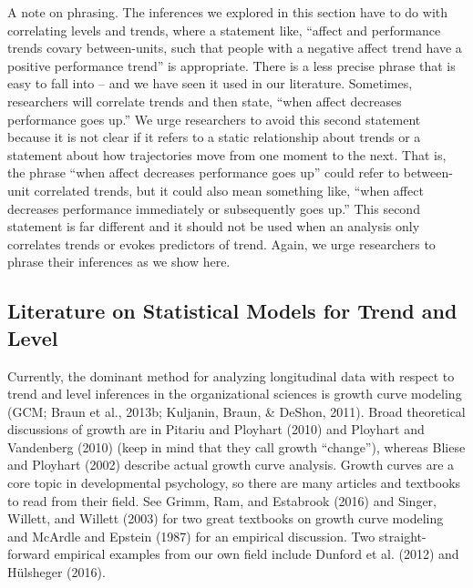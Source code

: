 \documentclass[english,,man]{apa6}
\begin{document}
A note on phrasing. The inferences we explored in this section have to do with correlating levels and trends, where a statement like, \enquote{affect and performance trends covary between-units, such that people with a negative affect trend have a positive performance trend} is appropriate. There is a less precise phrase that is easy to fall into -- and we have seen it used in our literature. Sometimes, researchers will correlate trends and then state, \enquote{when affect decreases performance goes up.} We urge researchers to avoid this second statement because it is not clear if it refers to a static relationship about trends or a statement about how trajectories move from one moment to the next. That is, the phrase \enquote{when affect decreases performance goes up} could refer to between-unit correlated trends, but it could also mean something like, \enquote{when affect decreases performance immediately or subsequently goes up.} This second statement is far different and it should not be used when an analysis only correlates trends or evokes predictors of trend. Again, we urge researchers to phrase their inferences as we show here.

\hypertarget{literature-on-statistical-models-for-trend-and-level}{%
\subsection{Literature on Statistical Models for Trend and Level}\label{literature-on-statistical-models-for-trend-and-level}}

Currently, the dominant method for analyzing longitudinal data with respect to trend and level inferences in the organizational sciences is growth curve modeling (GCM; Braun et al., 2013b; Kuljanin, Braun, \& DeShon, 2011). Broad theoretical discussions of growth are in Pitariu and Ployhart (2010) and Ployhart and Vandenberg (2010) (keep in mind that they call growth \enquote{change}), whereas Bliese and Ployhart (2002) describe actual growth curve analysis. Growth curves are a core topic in developmental psychology, so there are many articles and textbooks to read from their field. See Grimm, Ram, and Estabrook (2016) and Singer, Willett, and Willett (2003) for two great textbooks on growth curve modeling and McArdle and Epstein (1987) for an empirical discussion. Two straight-forward empirical examples from our own field include Dunford et al. (2012) and Hülsheger (2016).
\end{document}
